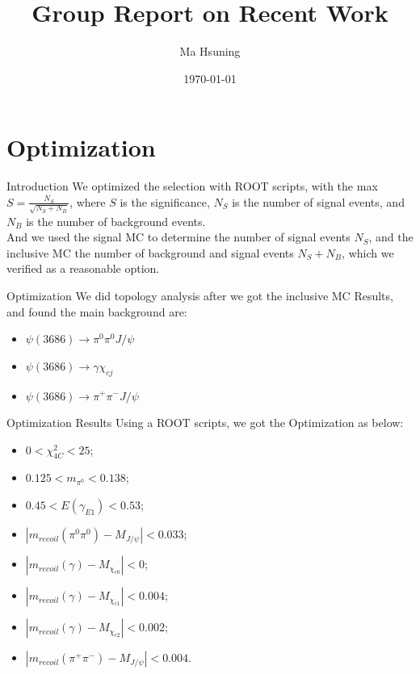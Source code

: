 \documentclass{beamer}
\title[Group Report]{Group Report on Recent Work}
\author{Ma Hsuning}
\institute[NKU]
{
    Physics of NKU\\
    \medskip
    \textit{maxn@ihep.ac.cn}
}
\date{\today}
\begin{document}
\frame{\titlepage}

\section{Optimization}
\begin{frame}{Introduction}
We optimized the selection with ROOT scripts, with the max $S=\frac{N_S}{\sqrt{N_S+N_B}}$, where $S$ is the significance, $N_S$ is the number of signal events, and $N_B$ is the number of background events.\\
        \bigskip
And we used the signal MC to determine the number of signal events $N_S$, and the inclusive MC the number of background and signal events $N_S+N_B$, which we verified as a reasonable option.
\end{frame}

\begin{frame}{Optimization}
We did topology analysis after we got the inclusive MC Results, and found the main background are:
    \begin{itemize}
    \item $\psi(3686) \rightarrow \pi^0 \pi^0 J/\psi$
    \item $\psi(3686)\rightarrow \gamma \chi_{cj}$
    \item $\psi(3686) \rightarrow \pi^+ \pi^- J/\psi$
    \end{itemize}
    \end{frame}
    \begin{frame}{Optimization Results}
    Using a ROOT scripts, we got the Optimization as below:
        \begin{itemize}
        \item $0<\chi_{4C}^2<25$;
        \item $0.125<m_{\pi^0}<0.138$;
        \item $0.45<E(\gamma_{E1})<0.53$;
        \item $|m_{recoil}(\pi^0 \pi^0)-M_{J/\psi}|<0.033$;
        \item $|m_{recoil}(\gamma)-M_{\chi_{c0}}|<0$;
        \item $|m_{recoil}(\gamma)-M_{\chi_{c1}}|<0.004$;
        \item $|m_{recoil}(\gamma)-M_{\chi_{c2}}|<0.002$;
        \item $|m_{recoil}(\pi^+ \pi^-)-M_{J/\psi}|<0.004$.
        \end{itemize}
        \end{frame}
\end{document}
